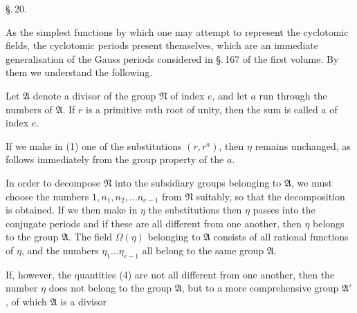 
\begin{center}
\S.\,20.

\end{center}

As the simplest functions by which one may attempt to represent the cyclotomic fields, the cyclotomic periods present themselves, which are an immediate generalisation of the Gauss periods considered in \S.\,167 of the first volume. By them we understand the following.

Let $\mathfrak{A}$ denote a divisor of the group $\mathfrak{N}$ of index $e$, and let $a$ run through the numbers of $\mathfrak{A}$. If $r$ is a primitive $m$th root of unity, then the sum
is called a  of index $e$.

If we make in (1) one of the substitutions $(r, r^a)$, then $\eta$ remains unchanged, as follows immediately from the group property of the $a$.

In order to decompose $\mathfrak{N}$ into the subsidiary groups belonging to $\mathfrak{A}$, we must choose the numbers $1, n_1, n_2, \ldots n_{e-1}$ from $\mathfrak{N}$ suitably, so that the decomposition
is obtained.
If we then make in $\eta$ the substitutions
then $\eta$ passes into the conjugate periods
and if these are all different from one another, then $\eta$ belongs to the group $\mathfrak{A}$. The field $\Omega(\eta)$ belonging to $\mathfrak{A}$ consists of all rational functions of $\eta$, and the numbers $\eta_1 \ldots \eta_{e-1}$ all belong to the same group $\mathfrak{A}$.

If, however, the quantities (4) are not all different from one another, then the number $\eta$ does not belong to the group $\mathfrak{A}$, but to a more comprehensive group $\mathfrak{A}'$, of which $\mathfrak{A}$ is a divisor
